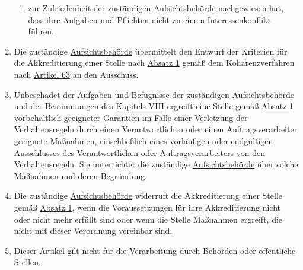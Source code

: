 \begin{enumerate}
\begin{enumerate}
    \item zur Zufriedenheit der zuständigen \hyperref[itm:04-21]{Aufsichtsbehörde} nachgewiesen hat, dass ihre Aufgaben und Pflichten nicht zu
     einem Interessenkonflikt führen.
    \label{itm:41-2d}

  \end{enumerate}

  \item Die zuständige \hyperref[itm:04-21]{Aufsichtsbehörde} übermittelt den Entwurf der Kriterien für die Akkreditierung einer Stelle nach
   \hyperref[itm:41-1]{Absatz 1} gemäß dem Kohärenzverfahren nach \hyperref[ch:63]{Artikel 63} an den Ausschuss.
  \label{itm:41-3}

  \item Unbeschadet der Aufgaben und Befugnisse der zuständigen \hyperref[itm:04-21]{Aufsichtsbehörde} und der Bestimmungen des \hyperref
   [part:8]{Kapitels VIII} ergreift eine Stelle gemäß \hyperref[itm:41-1]{Absatz 1} vorbehaltlich geeigneter Garantien
   im Falle einer Verletzung der Verhaltensregeln durch einen Verantwortlichen oder einen Auftragsverarbeiter geeignete
   Maßnahmen, einschließlich eines vorläufigen oder endgültigen Ausschlusses des Verantwortlichen oder
   Auftragsverarbeiters von den Verhaltensregeln. Sie unterrichtet die zuständige \hyperref[itm:04-21]{Aufsichtsbehörde} über solche
   Maßnahmen und deren Begründung.
  \label{itm:41-4}

  \item Die zuständige \hyperref[itm:04-21]{Aufsichtsbehörde} widerruft die Akkreditierung einer Stelle gemäß \hyperref[itm:41-1]{Absatz 1},
   wenn die Voraussetzungen für ihre Akkreditierung nicht oder nicht mehr erfüllt sind oder wenn die Stelle Maßnahmen
   ergreift, die nicht mit dieser Verordnung vereinbar sind.
  \label{itm:41-5}

  \item Dieser Artikel gilt nicht für die \hyperref[itm:04-2]{Verarbeitung} durch Behörden oder öffentliche Stellen.
  \label{itm:41-6}

\end{enumerate}


